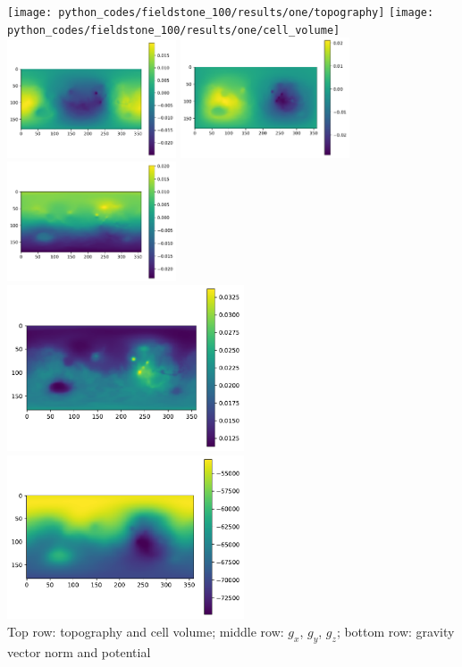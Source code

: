 \begin{center}
\texttt{[image: python\_codes/fieldstone\_100/results/one/topography]}
\texttt{[image: python\_codes/fieldstone\_100/results/one/cell\_volume]}\\
\includegraphics[width=5cm]{python_codes/fieldstone_100/results/one/gx}
\includegraphics[width=5cm]{python_codes/fieldstone_100/results/one/gy}
\includegraphics[width=5cm]{python_codes/fieldstone_100/results/one/gz}\\
\includegraphics[width=7cm]{python_codes/fieldstone_100/results/one/gg}
\includegraphics[width=7cm]{python_codes/fieldstone_100/results/one/UU}\\
{\captionfont Top row: topography and cell volume; middle row: $g_x$, $g_y$, $g_z$;
bottom row: gravity vector norm and potential}
\end{center}

